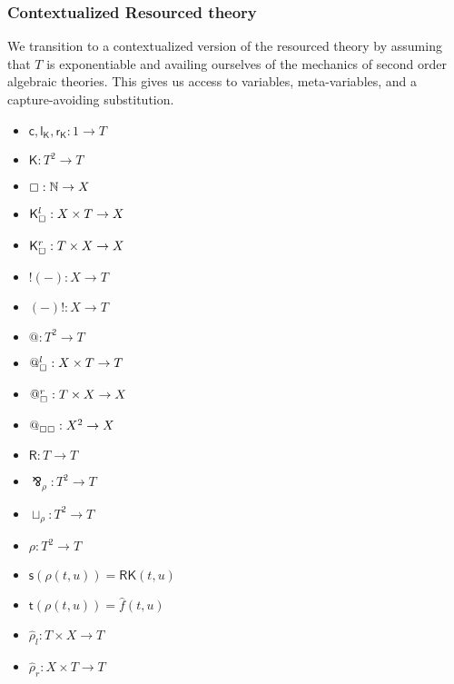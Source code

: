 \documentclass{llncs}
\renewcommand{\:}{\colon}
\newcommand{\NN}{\mathbb{N}}
\begin{document}
\subsubsection{Contextualized Resourced theory}
We transition to a contextualized version of the resourced theory by
assuming that $T$ is exponentiable and availing ourselves of the
mechanics of second order algebraic theories. This gives us access to
variables, meta-variables, and a capture-avoiding substitution. 


\begin{itemize}
  \item $\mathsf{c}, \mathsf{l}_{\mathsf{K}}, \mathsf{r}_{\mathsf{K}} : 1 \rightarrow T$
  \item $\mathsf{K} : T^{2} \rightarrow T$
  \item $\boxempty : \NN \rightarrow X$
  \item $\mathsf{K}_{\boxempty}^{l} : X \times T \rightarrow X$
  \item $\mathsf{K}_{\boxempty}^{r} : T \times X \rightarrow X$
  \item $!(-) : X  \rightarrow T$
  \item $(-)! : X  \rightarrow T$
  \item $@ : T^{2} \rightarrow T$
  \item $@_{\boxempty}^{l} : X \times T \rightarrow T$
  \item $@_{\boxempty}^{r} : T \times X \rightarrow X$
  \item $@_{\boxempty\boxempty} : X^{2} \rightarrow X$
  \item $\mathsf{R} : T \rightarrow T$
  \item $\bindnasrepma_{\rho} : T^{2} \rightarrow T$
  \item $\sqcup_{\rho} : T^{2} \rightarrow T$
  \item $\rho : T^{2} \rightarrow T$             %
  \item $\mathsf{s}(\rho(t,u)) = \mathsf{R}\mathsf{K}(t, u)$ 
  \item $\mathsf{t}(\rho(t,u)) = \hat{f}(t,u)$          %
  \item $\hat{\rho}_{l} : T \times X \rightarrow T$             %
  \item $\hat{\rho}_{r} : X \times T \rightarrow T$             %

\end{itemize}
\end{document}
